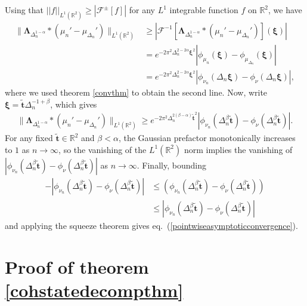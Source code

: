 \documentclass[a4paper,11pt]{article}
\theoremstyle{plain}
\theoremstyle{definition}
\theoremstyle{remark}
\newcommand{\bs}[1]{\boldsymbol{#1}}
\newcommand{\ba}{\begin{equation} \begin{aligned}}
\newcommand{\ea}{\end{aligned} \end{equation}}
\newcommand{\De}{\Delta}
\begin{document}
\begin{appendix}
Using that $||f||_{L^1(\mathbb{R}^2)} \geq | \mathcal{F}^{\pm}[f]|$ for any $L^1$ integrable function $f$ on $\mathbb{R}^2$, we have
    \ba
    \| \bs{\Lambda}_{\De_n^{1 - \alpha}}*(\mu_n'-\mu_{\De_n}') \|_{L^1(\mathbb{R}^2)} &\geq | \mathcal{F}^{-1}\left[ \bs{\Lambda}_{\De_n^{1 - \alpha}}*(\mu_n'-\mu_{\De_n}')  \right](\bs{\xi}) |\\
    & = e^{-2 \pi^2 \De_n^{2 -2\alpha} \bs{\xi}^2} |  \phi_{\mu_n}(\bs{\xi}) - \phi_{\mu_{\De_n}}(\bs{\xi}) |\\
    & =  e^{-2 \pi^2 \De_n^{2 - 2\alpha} \bs{\xi}^2} | \phi_{\nu_n}(\De_n \bs{\xi}) - \phi_{\nu}(\De_n\bs{\xi})  |,
    \ea
where we used theorem \ref{convthm} to obtain the second line. Now, write $\bs{\xi} = \tilde{\bs{t}}\De_n^{-1 + \beta} $, which gives
\ba
\| \bs{\Lambda}_{\De_n^{1 - \alpha}}*(\mu_n'-\mu_{\De_n}') \|_{L^1(\mathbb{R}^2)} \geq  e^{-2 \pi^2 \De_n^{2(\beta -\alpha)} \tilde{\bs{t}}^2}|  \phi_{\nu_n}(\De_n^{\beta} \tilde{\bs{t}}) -\phi_{\nu}(\De_n^{\beta} \tilde{\bs{t}})  |.
\ea
For any fixed $\tilde{\bs{t}} \in \mathbb{R}^2$ and $\beta <\alpha$, the Gaussian prefactor monotonically increases to $1$ as $n \to \infty$, so the vanishing of the $L^1(\mathbb{R}^2)$ norm implies the vanishing of $| \phi_{\nu_n}(\De_n^{\beta} \tilde{\bs{t}}) -\phi_{\nu}(\De_n^{\beta} \tilde{\bs{t}})  |$ as $n \to \infty$. Finally, bounding 
\ba
-|\phi_{\nu_n}(\De_n^{\beta} \tilde{\bs{t}}) -\phi_{\nu}(\De_n^{\beta} \tilde{\bs{t}})  | &\leq \left(\phi_{\nu_n}(\De_n^{\beta} \tilde{\bs{t}}) -\phi_{\nu}(\De_n^{\beta} \tilde{\bs{t}}) \right)  \\&\leq |\phi_{\nu_n}(\De_n^{\beta} \tilde{\bs{t}}) -\phi_{\nu}(\De_n^{\beta} \tilde{\bs{t}})  |
\ea 
and applying the squeeze theorem gives eq.~(\ref{pointwiseasymptoticconvergence}).


\section{Proof of theorem \ref{cohstatedecompthm}}
\label{cohstatedecompthmproof}


\end{appendix}
\end{document}
